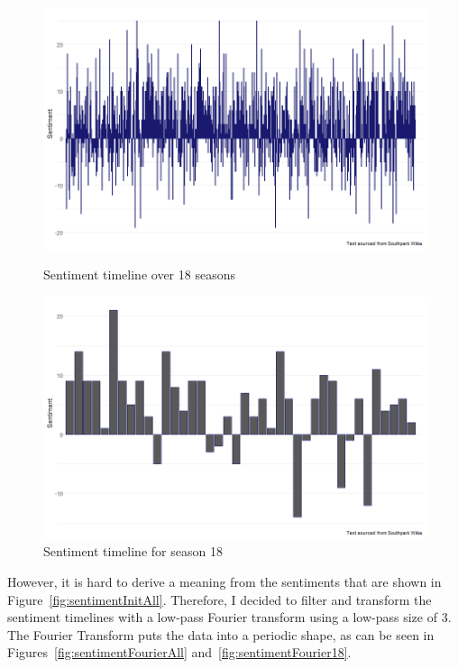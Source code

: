 \documentclass[10pt,a4paper]{article}
\begin{document}
	\begin{figure}[!h]
  \centering
  \begin{minipage}[b]{0.45\textwidth}
    \includegraphics[width=\textwidth]{images/sentimentInitAll.png}
    \caption{Sentiment timeline over 18 seasons}
	\label{fig:sentimentInitAll}
  \end{minipage}
  \hfill
  \begin{minipage}[b]{0.45\textwidth}
    \includegraphics[width=\textwidth]{images/sentimentInit18.png}
    \caption{Sentiment timeline for season 18}
	\label{fig:sentimentInit18}
  \end{minipage}
\end{figure}

However, it is hard to derive a meaning from the sentiments that are shown in Figure~\ref{fig:sentimentInitAll}. Therefore, I decided to filter and transform the sentiment timelines with a low-pass Fourier transform using a low-pass size of 3. The Fourier Transform puts the data into a periodic shape, as can be seen in Figures~\ref{fig:sentimentFourierAll} and~\ref{fig:sentimentFourier18}.
		
\end{document}
